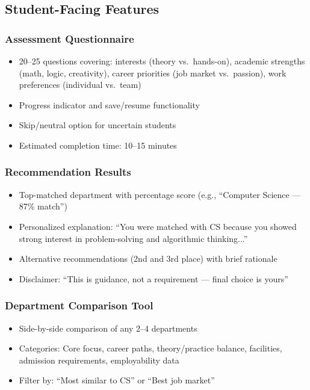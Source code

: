 \documentclass[12pt, a4paper]{article}
\begin{document}
\subsection{Student-Facing Features}

\subsubsection*{Assessment Questionnaire}
\begin{itemize}[leftmargin=1.5em, itemsep=2pt]
\item 20–25 questions covering: interests (theory vs.\ hands-on), academic strengths (math, logic, creativity), career priorities (job market vs.\ passion), work preferences (individual vs.\ team)
\item Progress indicator and save/resume functionality
\item Skip/neutral option for uncertain students
\item Estimated completion time: 10–15 minutes
\end{itemize}

\subsubsection*{Recommendation Results}
\begin{itemize}[leftmargin=1.5em, itemsep=2pt]
\item Top-matched department with percentage score (e.g., ``Computer Science — 87\% match'')
\item Personalized explanation: ``You were matched with CS because you showed strong interest in problem-solving and algorithmic thinking...''
\item Alternative recommendations (2nd and 3rd place) with brief rationale
\item Disclaimer: ``This is guidance, not a requirement — final choice is yours''
\end{itemize}

\subsubsection*{Department Comparison Tool}
\begin{itemize}[leftmargin=1.5em, itemsep=2pt]
\item Side-by-side comparison of any 2–4 departments
\item Categories: Core focus, career paths, theory/practice balance, facilities, admission requirements, employability data
\item Filter by: ``Most similar to CS'' or ``Best job market''
\end{itemize}
\end{document}
